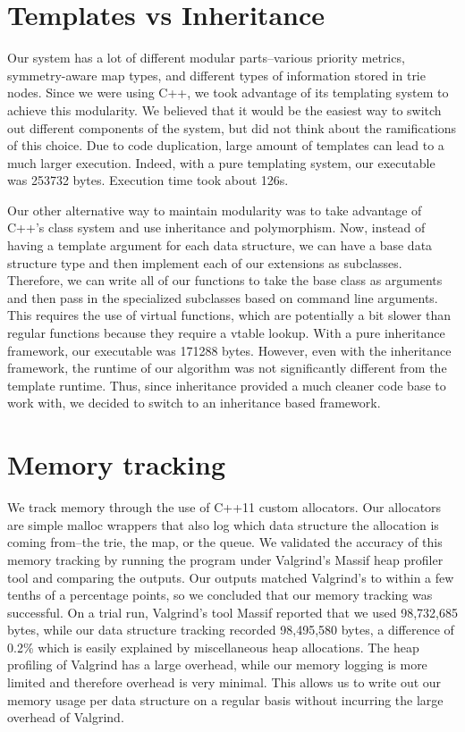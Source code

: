 \documentclass[]{article}
\begin{document}
\section{Templates vs Inheritance}
Our system has a lot of different modular parts--various priority metrics, symmetry-aware map types, and different types of information stored in trie nodes.
Since we were using C++, we took advantage of its templating system to achieve this modularity.
We believed that it would be the easiest way to switch out different components of the system, but did not think about the ramifications of this choice.
Due to code duplication, large amount of templates can lead to a much larger execution.
Indeed, with a pure templating system, our executable was 253732 bytes.
Execution time took about 126s.

Our other alternative way to maintain modularity was to take advantage of C++'s class system and use inheritance and polymorphism.
Now, instead of having a template argument for each data structure, we can have a base data structure type and then implement each of our extensions as subclasses.
Therefore, we can write all of our functions to take the base class as arguments and then pass in the specialized subclasses based on command line arguments.
This requires the use of virtual functions, which are potentially a bit slower than regular functions because they require a vtable lookup.
With a pure inheritance framework, our executable was 171288 bytes.
However, even with the inheritance framework, the runtime of our algorithm was not significantly different from the template runtime.
Thus, since inheritance provided a much cleaner code base to work with, we decided to switch to an inheritance based framework.

\section{Memory tracking}
We track memory through the use of C++11 custom allocators.
Our allocators are simple malloc wrappers that also log which data structure the allocation is coming from--the trie, the map, or the queue.
We validated the accuracy of this memory tracking by running the program under Valgrind's Massif heap profiler tool and comparing the outputs.
Our outputs matched Valgrind's to within a few tenths of a percentage points, so we concluded that our memory tracking was successful.
On a trial run, Valgrind's tool Massif reported that we used 98,732,685 bytes, while our data structure tracking recorded 98,495,580 bytes, a difference of 0.2\% which is easily explained by miscellaneous heap allocations.
The heap profiling of Valgrind has a large overhead, while our memory logging is more limited and therefore overhead is very minimal.
This allows us to write out our memory usage per data structure on a regular basis without incurring the large overhead of Valgrind.
\end{document}
